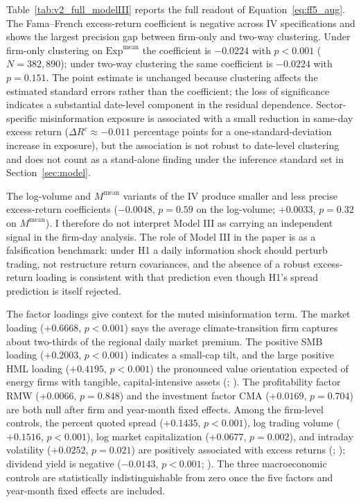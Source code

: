 \documentclass{article}
\theoremstyle{plain}
\begin{document}
Table~\ref{tab:v2_full_modelIII} reports the full readout of Equation~\ref{eq:ff5_aug}. The Fama--French excess-return coefficient is negative across IV specifications and shows the largest precision gap between firm-only and two-way clustering. Under firm-only clustering on $\mathrm{Exp}^{\text{mean}}$ the coefficient is $-0.0224$ with $p<0.001$ ($N=382{,}890$); under two-way clustering the same coefficient is $-0.0224$ with $p=0.151$. The point estimate is unchanged because clustering affects the estimated standard errors rather than the coefficient; the loss of significance indicates a substantial date-level component in the residual dependence. Sector-specific misinformation exposure is associated with a small reduction in same-day excess return ($\Delta R^e \approx -0.011$ percentage points for a one-standard-deviation increase in exposure), but the association is not robust to date-level clustering and does not count as a stand-alone finding under the inference standard set in Section~\ref{sec:model}.

The log-volume and $M^{\text{mean}}$ variants of the IV produce smaller and less precise excess-return coefficients ($-0.0048$, $p=0.59$ on the log-volume; $+0.0033$, $p=0.32$ on $M^{\text{mean}}$). I therefore do not interpret Model III as carrying an independent signal in the firm-day analysis. The role of Model III in the paper is as a falsification benchmark: under H1 a daily information shock should perturb trading, not restructure return covariances, and the absence of a robust excess-return loading is consistent with that prediction even though H1's spread prediction is itself rejected.



The factor loadings give context for the muted misinformation term. The market loading ($+0.6668$, $p<0.001$) says the average climate-transition firm captures about two-thirds of the regional daily market premium. The positive SMB loading ($+0.2003$, $p<0.001$) indicates a small-cap tilt, and the large positive HML loading ($+0.4195$, $p<0.001$) the pronounced value orientation expected of energy firms with tangible, capital-intensive assets (\cite{fama1993}; \cite{fama2015}). The profitability factor RMW ($+0.0066$, $p=0.848$) and the investment factor CMA ($+0.0169$, $p=0.704$) are both null after firm and year-month fixed effects. Among the firm-level controls, the percent quoted spread ($+0.1435$, $p<0.001$), log trading volume ($+0.1516$, $p<0.001$), log market capitalization ($+0.0677$, $p=0.002$), and intraday volatility ($+0.0252$, $p=0.021$) are positively associated with excess returns (\cite{AmihudMendelson1986}; \cite{Parkinson1980}); dividend yield is negative ($-0.0143$, $p<0.001$; \cite{FamaFrench1993}). The three macroeconomic controls are statistically indistinguishable from zero once the five factors and year-month fixed effects are included.
\end{document}
